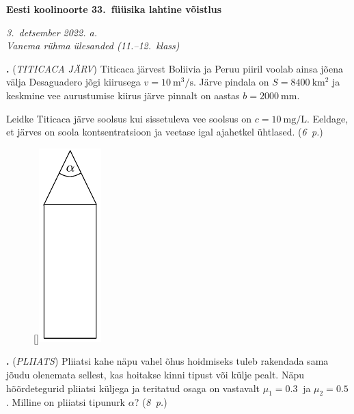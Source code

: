 \documentclass[11pt,a5paper]{article}
\newcommand{\numb}[1]{\vspace{5pt}\textbf{\large #1}}
\newcommand{\nimi}[1]{(\textsl{\small #1})}
\newcommand{\punktid}[1]{(\emph{#1~p.})}
\newcounter{ylesanne}
\newcommand{\yl}[1]{\addtocounter{ylesanne}{1}\numb{\theylesanne.} \nimi{#1} \newblock{}}
\newcommand{\autor}[1]{}%
\begin{document}
\begin{center}
  \textbf{\Large Eesti koolinoorte 33.\ füüsika lahtine võistlus} \par
  \emph{3.\ detsember 2022. a.\\Vanema rühma ülesanded (11.--12.\ klass)}
\end{center}

 \par



\yl{TITICACA JÄRV}
Titicaca järvest Boliivia ja Peruu piiril voolab ainsa jõena välja Desaguadero jõgi kiirusega $v=\SI{10}{\meter\cubed\per\second}$. Järve pindala on $S=\SI{8400}{\kilo\meter\squared}$ ja keskmine vee aurustumise kiirus järve pinnalt on aastas $b=\SI{2000}{\milli\meter}$. 

Leidke Titicaca järve soolsus kui sissetuleva vee soolsus on $c=\SI{10}{\milli\gram\per\liter}$. Eeldage, et järves on soola kontsentratsioon ja veetase igal ajahetkel ühtlased.
\punktid{6} \autor{Kaur Aare Saar}



\begin{figure}
\raisebox{3pt}[\dimexpr{}\baselineskip\relax]{\includegraphics[scale=0.95]{pliiats_joonis.pdf}}
\vspace{-55pt}
\end{figure}
\yl{PLIIATS}
Pliiatsi kahe näpu vahel õhus hoidmiseks tuleb rakendada sama jõudu olenemata sellest, kas hoitakse kinni tipust või külje pealt. Näpu hõõrdetegurid pliiatsi küljega ja teritatud osaga on vastavalt $\mu_1 = \SI{0,3}{}$ ja $\mu_2 = \SI{0,5}{}$. Milline on pliiatsi tipunurk $\alpha$?
\punktid{8} \autor{Joonas Kalda}
\end{document}

